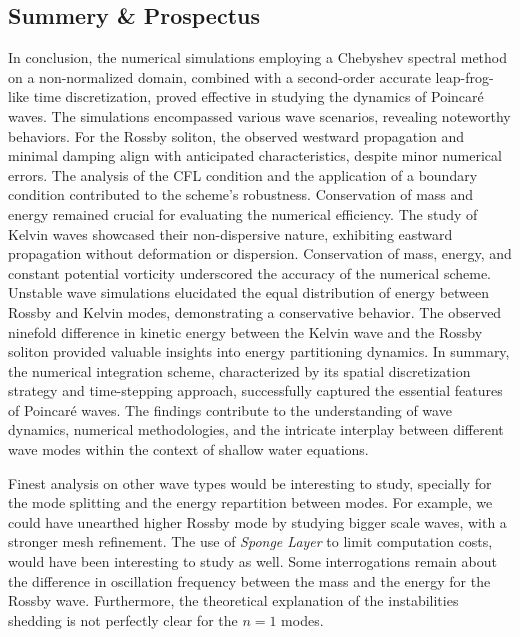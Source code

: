 \documentclass[11pt,a4paper]{report}
\begin{document}
\begin{multicols}{2}
    \chapter{Summery \& Prospectus}

    In conclusion, the numerical simulations employing a Chebyshev spectral method on a non-normalized domain, combined with a second-order accurate leap-frog-like time discretization, proved effective in studying the dynamics of Poincaré waves. The simulations encompassed various wave scenarios, revealing noteworthy behaviors. For the Rossby soliton, the observed westward propagation and minimal damping align with anticipated characteristics, despite minor numerical errors. The analysis of the CFL condition and the application of a boundary condition contributed to the scheme's robustness. Conservation of mass and energy remained crucial for evaluating the numerical efficiency.
    The study of Kelvin waves showcased their non-dispersive nature, exhibiting eastward propagation without deformation or dispersion. Conservation of mass, energy, and constant potential vorticity underscored the accuracy of the numerical scheme.
    Unstable wave simulations elucidated the equal distribution of energy between Rossby and Kelvin modes, demonstrating a conservative behavior. The observed ninefold difference in kinetic energy between the Kelvin wave and the Rossby soliton provided valuable insights into energy partitioning dynamics.
    In summary, the numerical integration scheme, characterized by its spatial discretization strategy and time-stepping approach, successfully captured the essential features of Poincaré waves. The findings contribute to the understanding of wave dynamics, numerical methodologies, and the intricate interplay between different wave modes within the context of shallow water equations.

    Finest analysis on other wave types would be interesting to study, specially for the mode splitting and the energy repartition between modes. For example, we could have unearthed higher Rossby mode by studying bigger scale waves, with a stronger mesh refinement. The use of \emph{Sponge Layer} to limit computation costs,
    would have been interesting to study as well. Some interrogations remain about the difference in oscillation frequency between the mass and the energy for the Rossby wave. Furthermore, the theoretical explanation of the instabilities shedding is not perfectly clear for the $n = 1$ modes.

\end{multicols}
\printbibliography
\end{document}
